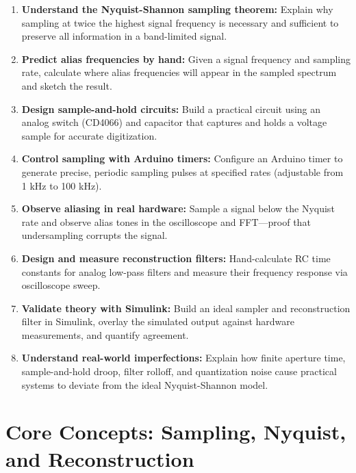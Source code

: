 \documentclass[11pt,letterpaper]{article}
\begin{document}
\begin{enumerate}
    \item \textbf{Understand the Nyquist-Shannon sampling theorem:} Explain why sampling at twice the highest signal frequency is necessary and sufficient to preserve all information in a band-limited signal.

    \item \textbf{Predict alias frequencies by hand:} Given a signal frequency and sampling rate, calculate where alias frequencies will appear in the sampled spectrum and sketch the result.

    \item \textbf{Design sample-and-hold circuits:} Build a practical circuit using an analog switch (CD4066) and capacitor that captures and holds a voltage sample for accurate digitization.

    \item \textbf{Control sampling with Arduino timers:} Configure an Arduino timer to generate precise, periodic sampling pulses at specified rates (adjustable from 1 kHz to 100 kHz).

    \item \textbf{Observe aliasing in real hardware:} Sample a signal below the Nyquist rate and observe alias tones in the oscilloscope and FFT—proof that undersampling corrupts the signal.

    \item \textbf{Design and measure reconstruction filters:} Hand-calculate RC time constants for analog low-pass filters and measure their frequency response via oscilloscope sweep.

    \item \textbf{Validate theory with Simulink:} Build an ideal sampler and reconstruction filter in Simulink, overlay the simulated output against hardware measurements, and quantify agreement.

    \item \textbf{Understand real-world imperfections:} Explain how finite aperture time, sample-and-hold droop, filter rolloff, and quantization noise cause practical systems to deviate from the ideal Nyquist-Shannon model.
\end{enumerate}

\clearpage

\section{Core Concepts: Sampling, Nyquist, and Reconstruction}
\end{document}
